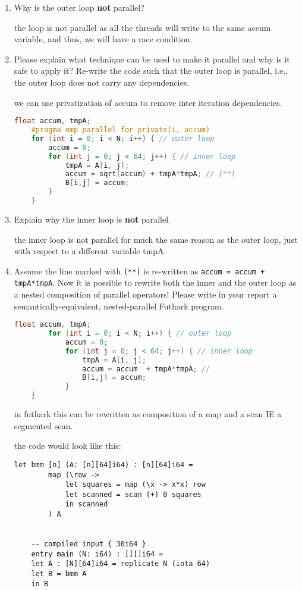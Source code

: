\documentclass{article}
\begin{document}
\begin{enumerate}
    \item Why is the outer loop \textbf{not} parallel? 
    
    the loop is not parallel as all the threads will write to the same accum variable, and thus, we will have a race condition.

    \item Please explain what technique can be used to make it parallel and why is it safe to apply it?
  Re-write the code such that the outer loop is parallel, 
        i.e., the outer loop does not carry any dependencies.

    we can use privatization of accum to remove inter iteration dependencies.
    \begin{lstlisting}[language=c]
    float accum, tmpA;
    #pragma omp parallel for private(i, accum)
    for (int i = 0; i < N; i++) { // outer loop
        accum = 0;
        for (int j = 0; j < 64; j++) { // inner loop
            tmpA = A[i, j];
            accum = sqrt(accum) + tmpA*tmpA; // (**)
            B[i,j] = accum;
        }
    }
    \end{lstlisting}


    \item Explain why the inner loop is \textbf{not} parallel.
    
    the inner loop is not parallel for much the same reason as the outer loop, just with respect to a different variable tmpA.

    \item Assume the line marked with \texttt{(**)} is re-written as \texttt{accum = accum + tmpA*tmpA}.
  Now it is possible to rewrite both the inner and the outer loop as a nested 
    composition of parallel operators! Please write in your report a 
    semantically-equivalent, nested-parallel Futhark program.

    \begin{lstlisting}[language=c]
        float accum, tmpA;
        for (int i = 0; i < N; i++) { // outer loop
            accum = 0;
            for (int j = 0; j < 64; j++) { // inner loop
                tmpA = A[i, j];
                accum = accum  + tmpA*tmpA; // 
                B[i,j] = accum;
            }
    }
    \end{lstlisting}

    in futhark this can be rewritten as composition of a map and a scan IE a segmented scan.

    the code would look like this:

    \begin{lstlisting}[language=futhark]
    let bmm [n] (A: [n][64]i64) : [n][64]i64 =
        map (\row ->
            let squares = map (\x -> x*x) row
            let scanned = scan (+) 0 squares
            in scanned
        ) A


    -- compiled input { 30i64 }
    entry main (N: i64) : [][]i64 = 
    let A : [N][64]i64 = replicate N (iota 64)
    let B = bmm A
    in B
  
    \end{lstlisting}


\end{enumerate}
\end{document}
